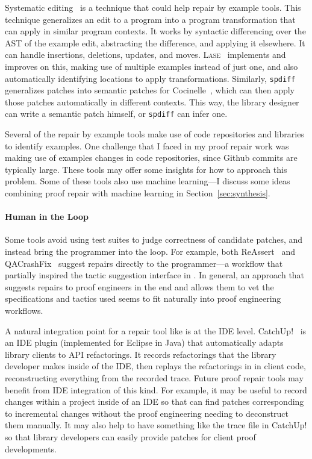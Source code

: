 Systematic editing~\cite{meng2011systematic} is a technique that could help repair by example tools.
This technique generalizes an edit to a program into a program transformation that can apply in similar program contexts.
It works by syntactic differencing over the AST of the example edit, abstracting the difference, and applying it elsewhere.
It can handle insertions, deletions, updates, and moves.
\textsc{Lase}~\cite{meng2013lase} implements and improves on this,
making use of multiple examples instead of just one, %
and also automatically identifying locations to apply transformations.
Similarly, \lstinline{spdiff}~\cite{andersen2010generic} generalizes patches into semantic patches for Cocinelle~\cite{padioleau2008documenting},
which can then apply those patches automatically in different contexts. This way, the library designer can write a semantic patch
himself, or \lstinline{spdiff} can infer one.

Several of the repair by example tools make use of code repositories and libraries to identify examples.
One challenge that I faced in my proof repair work was making use of examples changes in code repositories, since Github commits are typically large.
These tools may offer some insights for how to approach this problem.
Some of these tools also use machine learning---I discuss some ideas combining proof repair
with machine learning in Section~\ref{sec:synthesis}.

\paragraph{Human in the Loop}
Some tools avoid using test suites to judge correctness of candidate patches, and instead
bring the programmer into the loop. For example, both ReAssert~\cite{daniel2009reassert}
and QACrashFix~\cite{gao2015fixing} suggest repairs directly to the programmer---a workflow
that partially inspired the tactic suggestion interface in \toolnamec.
In general, an approach that suggests repairs to proof engineers in the end
and allows them to vet the specifications and tactics used seems to fit naturally into proof engineering workflows. 

A natural integration point for a repair tool like \sysnamelong is at the IDE level. 
CatchUp!~\cite{Henkel:2005:CCR:1062455.1062512} is an IDE plugin (implemented for Eclipse in Java) that automatically adapts library clients to API refactorings.
It records refactorings that the library developer makes inside of the IDE,
then replays the refactorings in in client code, reconstructing everything from the recorded trace.
Future proof repair tools may benefit from IDE integration of this kind.
For example, it may be useful to record changes within a project inside of an IDE 
so that \sysnamelong can find patches corresponding to incremental changes without the proof engineering needing to deconstruct them manually.
It may also help to have something like the trace file in CatchUp! so that library developers can easily provide patches for client proof developments.

